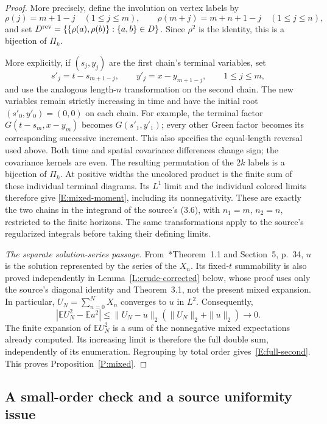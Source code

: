 \documentclass[12pt]{article}
\numberwithin{equation}{section}
\theoremstyle{definition}
\newcommand{\E}{\mathbb{E}}
\begin{document}
\begin{proof}
  More precisely, define the involution on vertex labels by
  \[
    \rho(j)=m+1-j\quad(1\le j\le m),\qquad
    \rho(m+j)=m+n+1-j\quad(1\le j\le n),
  \]
  and set $D^{\rm rev}=\{\{\rho(a),\rho(b)\}:\{a,b\}\in D\}$.
  Since $\rho^2$ is the identity, this is a bijection of $\Pi_k$.

  More explicitly, if $(s_j,y_j)$ are the first chain's terminal
  variables, set
  \[
    s'_j=t-s_{m+1-j},\qquad y'_j=x-y_{m+1-j},
    \qquad 1\le j\le m,
  \]
  and use the analogous length-$n$ transformation on the second chain.
  The new variables remain strictly increasing in time and have the
  initial root $(s'_0,y'_0)=(0,0)$ on each chain. For example, the
  terminal factor $G(t-s_m,x-y_m)$ becomes $G(s'_1,y'_1)$;
  every other Green factor becomes its corresponding successive
  increment. This also specifies the equal-length reversal used above.
  Both time and spatial covariance differences change sign; the covariance
  kernels are even. The resulting permutation of the $2k$ labels is a
  bijection of $\Pi_k$. At positive widths the uncolored product is
  the finite sum of these individual terminal diagrams. Its $L^1$
  limit and the individual colored limits therefore give
  \eqref{E:mixed-moment}, including its
  nonnegativity. These are exactly the two chains in the integrand of
  the source's (3.6), with $n_1=m$, $n_2=n$, restricted to the finite
  horizons. The same transformations apply to the source's regularized
  integrals before taking their defining limits.

  \emph{The separate solution-series passage.}
  From~\cite{chen:author2026:time-dependency}*{Theorem~1.1 and Section~5,
  p.~34}, $u$ is the solution represented by the series of the $X_n$.
  Its fixed-$t$ summability is also proved independently in
  Lemma~\ref{L:crude-corrected} below, whose proof uses only the source's
  diagonal identity and Theorem~3.1, not the present mixed expansion.
  In particular, $U_N=\sum_{n=0}^N X_n$ converges to $u$ in $L^2$.
  Consequently,
  \[
    |\E U_N^2-\E u^2|
    \le\|U_N-u\|_2(\|U_N\|_2+\|u\|_2)\longrightarrow0.
  \]
  The finite expansion of $\E U_N^2$ is a sum of the nonnegative mixed
  expectations already computed. Its increasing limit is therefore the
  full double sum, independently of its enumeration. Regrouping by total
  order gives~\eqref{E:full-second}. This proves Proposition~\ref{P:mixed}.
\end{proof}

\subsection{A small-order check and a source uniformity issue}
\end{document}
